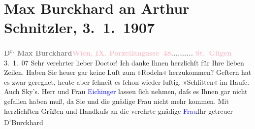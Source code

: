 

               \section[Max Burckhard an Arthur Schnitzler, 3. 1. 1907]{ Max Burckhard an Arthur Schnitzler, 3. 1. 1907}\nopagebreak{}\rehead{ }\normalsize\beginnumbering{} \toendnotes[C]{\smallbreak\pagebreak[2]} 
\toendnotes[C]{\smallbreak}\pstart
           \noindent{}{\pb}\textcolor{gray}{\textbf{D\textsuperscript{r.} Max Burckhard}}\hfill \textcolor{gray}{\textbf{\textcolor{pink}{Wien, IX. Porzellangasse 48}{}\ledrightnote{\textcolor{pink}{Porzellangasse}}{ }..........}}\pend
           \pstart
           \raggedleft{}\textcolor{gray}{\textbf{\textcolor{pink}{St. Gilgen}{}\ledrightnote{\textcolor{pink}{St. Gilgen}}}}{ }3. 1. 07\pend
           \pstart{}Sehr verehrter lieber Doctor!\pend\pstart
           Ich danke Ihnen herzlichſt für Ihre lieben Zeilen. Haben Sie heuer gar keine Luſt
                    zum »Rodeln« herzukommen? Geſtern hat es zwar geregnet, heute aber ſchneit es
                    ſchon wieder luſtig. »Schlitten« im Hauſe. Auch Sky’s. Herr und Frau \textcolor{blue}{Eichinger}{}\ledrightnote{\textcolor{blue}{Eichinger}{\newline}\textcolor{blue}{Eichinger}} lassen ſich \label{T_L01648_1v}\label{T_L01648_1h} nehmen, daſs es Ihnen gar {\pb}nicht gefallen haben muß, da Sie und
                    die gnädige Frau nicht mehr kommen.\pend
           \pstart
           Mit herzlichſten Grüßen und Handkuſs an die verehrte gnädige \textcolor{blue}{Frau}{}\hspace*{1.5em}Ihr\pend
           \pstart getreuer \spacefill\mbox{D\textsuperscript{r}Burckhard}\pend{}\endnumbering{}  
      